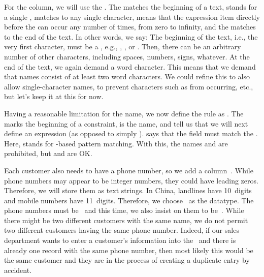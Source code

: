 For the  column, we will use the  .
The \textil{^} matches the beginning of a text, \textil{\\w} stands for a single ,  matches to any single character, \textil{*} means that the expression item directly before the \textil{*} can occur any number of times, from zero to infinity, and the \textil{\$} matches to the end of the text.
In other words, we say:
The beginning of the text, i.e., the very first character, must be a , e.g., , , or .
Then, there can be an arbitrary number of other characters, including spaces, numbers, signs, whatever.
At the end of the text, we again demand a word character.
This means that we demand that names consist of at least two word characters.
We could refine this to also allow single-character names, to prevent characters such as  from occurring, etc., but let's keep it at this for now.%
%
\begin{sloppypar}%
Having a reasonable limitation for the name, we now define the rule  as \sqlIdx{\$}\sqlIdx{\textasciicircum}\sqlIdx{\textasciitilde}.
The  marks the beginning of a constraint,  is the name, and  tell us that we will next define an expression (as opposed to simply ).
\sqlIdx{\$}\sqlIdx{\textasciicircum}\sqlIdx{\textasciitilde} says that the field  must match the  .
Here, \sqlil{\~}\sqlIdx{\textasciitilde} stands for -based pattern matching.
With this, the names  and  are prohibited, but  and  are OK.%
\end{sloppypar}%
%
Each customer also needs to have a phone number, so we add a column~.
While phone numbers may appear to be integer numbers, they could have leading zeros.
Therefore, we will store them as text strings.
In China, landlines have 10~digits and mobile numbers have 11~digits.
Therefore, we choose~ as the datatype.
The phone numbers must be~ and this time, we also insist on them to be~.
While there might be two different customers with the same name, we do not permit two different customers having the same phone number.
Indeed, if our sales department wants to enter a customer's information into the \db\ and there is already one record with the same phone number, then most likely this would be the same customer and they are in the process of creating a duplicate entry by accident.


